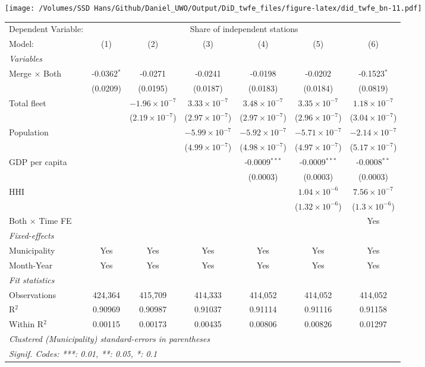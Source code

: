 \documentclass[
]{article}
\begin{document}
\texttt{[image: /Volumes/SSD Hans/Github/Daniel\_UWO/Output/DiD\_twfe\_files/figure-latex/did\_twfe\_bn-11.pdf]}

\begin{tabular}{lcccccc}
\tabularnewline\midrule\midrule
Dependent Variable:&\multicolumn{6}{c}{Share of independent stations}\\
Model:&(1) & (2) & (3) & (4) & (5) & (6)\\
\midrule \emph{Variables}&   &   &   &   &   &  \\
Merge $\times $ Both & -0.0362$^{*}$ & -0.0271 & -0.0241 & -0.0198 & -0.0202 & -0.1523$^{*}$\\
  &(0.0209) & (0.0195) & (0.0187) & (0.0183) & (0.0184) & (0.0819)\\
Total fleet &    & $-1.96\times 10^{-7}$ & $3.33\times 10^{-7}$ & $3.48\times 10^{-7}$ & $3.35\times 10^{-7}$ & $1.18\times 10^{-7}$\\
  &   & ($2.19\times 10^{-7}$) & ($2.97\times 10^{-7}$) & ($2.97\times 10^{-7}$) & ($2.96\times 10^{-7}$) & ($3.04\times 10^{-7}$)\\
Population &    &    & $-5.99\times 10^{-7}$ & $-5.92\times 10^{-7}$ & $-5.71\times 10^{-7}$ & $-2.14\times 10^{-7}$\\
  &   &    & ($4.99\times 10^{-7}$) & ($4.98\times 10^{-7}$) & ($4.97\times 10^{-7}$) & ($5.17\times 10^{-7}$)\\
GDP per capita &    &    &    & -0.0009$^{***}$ & -0.0009$^{***}$ & -0.0008$^{**}$\\
  &   &    &    & (0.0003) & (0.0003) & (0.0003)\\
HHI &    &    &    &    & $1.04\times 10^{-6}$ & $7.56\times 10^{-7}$\\
  &   &    &    &    & ($1.32\times 10^{-6}$) & ($1.3\times 10^{-6}$)\\
Both $\times$ Time FE &  &  &  &  &  & Yes\\
\midrule \emph{Fixed-effects}&   &   &   &   &   &  \\
Municipality & Yes & Yes & Yes & Yes & Yes & Yes\\
Month-Year & Yes & Yes & Yes & Yes & Yes & Yes\\
\midrule \emph{Fit statistics}&  & & & & & \\
Observations & 424,364&415,709&414,333&414,052&414,052&414,052\\
R$^2$ & 0.90969&0.90987&0.91037&0.91114&0.91116&0.91158\\
Within R$^2$ & 0.00115&0.00173&0.00435&0.00806&0.00826&0.01297\\
\midrule\midrule\multicolumn{7}{l}{\emph{Clustered (Municipality) standard-errors in parentheses}}\\
\multicolumn{7}{l}{\emph{Signif. Codes: ***: 0.01, **: 0.05, *: 0.1}}\\
\end{tabular}
\end{document}
